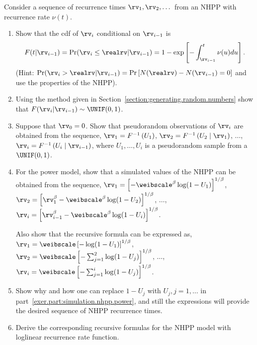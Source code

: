 \begin{exercise1}
Consider a sequence of recurrence times $\rv_{1},\rv_{2}, \dots$ 
from an NHPP with recurrence rate $\nu(t)$.
\begin{enumerate}
\item
\label{exer.part:nhpp.cond.dist}
Show that the cdf of $\rv_{i}$ conditional on $\rv_{i-1}$ is
\begin{displaymath}
F(t |\rv_{i-1})=\Pr(\rv_{i} \le \realrv|\rv_{i-1})=1-
\exp
\left [
-\int_{\rv_{i-1}}^{t} \nu(u) du
\right ].
\end{displaymath}
(Hint: $\Pr(\rv_{i} > \realrv|\rv_{i-1})=
\Pr \left [N(\realrv)-N(\rv_{i-1})=0 \right ]$ and use 
the properties of the NHPP).
\item
Using the method given in Section~\ref{section:generating.random.numbers}
show that $F(\rv_{i}|\rv_{i-1}) \sim \UNIF(0,1)$.
\item
Suppose that $\rv_{0}=0$. 
Show that 
pseudorandom observations of $\rv_{i}$ are obtained
from the sequence,
$\rv_{1}=F^{-1}\left (U_{1} \right )$,
$\rv_{2}=F^{-1}\left (U_{2} \mid \rv_{1} \right )$,
$\dots$,
$\rv_{i}=F^{-1}\left (U_{i} \mid \rv_{i-1} \right )$,
where $U_{1}, \dots, U_{i}$ is a pseudorandom sample from a $\UNIF(0,1)$.
\item
\label{exer.part:simulation.nhpp.power}
For the power model, show that a simulated values of the NHPP can be obtained 
from the sequence,
$\rv_{1}=\left [ -\weibscale^{\beta} \log(1-U_{1})\right ]^{1/\beta}$,
$\rv_{2}=\left [ \rv_{1}^{\beta}-
\weibscale^{\beta} \log(1-U_{2}) \right ]^{1/\beta}$,
$\dots$,
$\rv_{i}=\left [ \rv_{i-1}^{\beta}-
\weibscale^{\beta} \log(1-U_{i})
\right ]^{1/\beta}$.

Also show that the recursive formula can be expressed
as,
$\rv_{1}=\weibscale \left [ -\log(1-U_{1}) \right ]^{1/\beta}$,
$\rv_{2}=\weibscale \left [ -\sum_{j=1}^{2}\log(1-U_{j})
\right ]^{1/\beta}$,
$\dots$,
$\rv_{i}=\weibscale \left [ -\sum_{j=1}^{i}\log(1-U_{j})
\right ]^{1/\beta}$.
\item
Show why and how one can replace $1-U_{j}$ with $U_{j}, j=1, \dots$ in
part~\ref{exer.part:simulation.nhpp.power}, and still the expressions will 
provide the desired sequence of NHPP recurrence times.
\item
Derive the corresponding recursive formulas for the NHPP model with
loglinear recurrence rate function.
\end{enumerate}
\end{exercise1}

